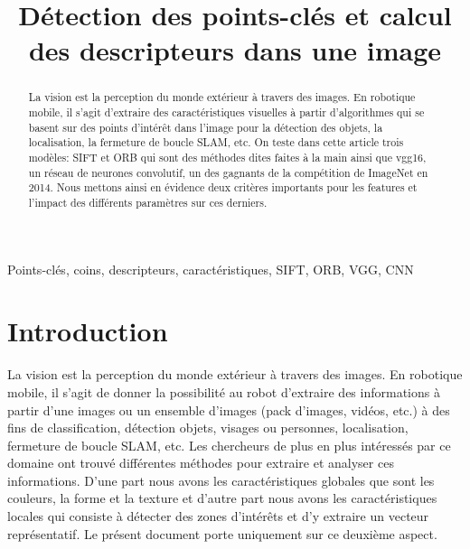 \documentclass[conference]{IEEEtran}
\begin{document}
\title{Détection des points-clés et calcul des descripteurs dans une image}

\author{
}

\maketitle

\begin{abstract}
La vision est la perception du monde extérieur à travers des images. En robotique mobile, il s'agit d'extraire des caractéristiques visuelles à partir d'algorithmes qui se basent sur des points d'intérêt dans l'image pour la détection des objets, la localisation, la fermeture de boucle SLAM, etc. On teste dans cette article trois modèles: SIFT et ORB qui sont des méthodes dites faites à la main ainsi que vgg16, un réseau de neurones convolutif, un des gagnants de la compétition de ImageNet en 2014. Nous mettons ainsi en évidence deux critères importants pour les features et l'impact des différents paramètres sur ces derniers. 
\end{abstract}

\begin{IEEEkeywords}
Points-clés, coins, descripteurs, caractéristiques, SIFT, ORB, VGG, CNN
\end{IEEEkeywords}

\section*{Introduction}
La vision est la perception du monde extérieur à travers des images. En robotique mobile, il s'agit de donner la possibilité au robot d'extraire des informations à partir d'une images ou un ensemble d'images (pack d'images, vidéos, etc.) à des fins de classification, détection objets, visages ou personnes, localisation, fermeture de boucle SLAM, etc. Les chercheurs de plus en plus intéressés 
par ce domaine ont trouvé différentes méthodes pour extraire et analyser ces informations. D'une part nous avons les caractéristiques globales que sont les couleurs, la forme et la texture et d'autre part nous avons les caractéristiques locales qui consiste à détecter des zones d'intérêts et d'y extraire un vecteur représentatif. Le présent document porte uniquement sur ce deuxième aspect. \\
\end{document}
